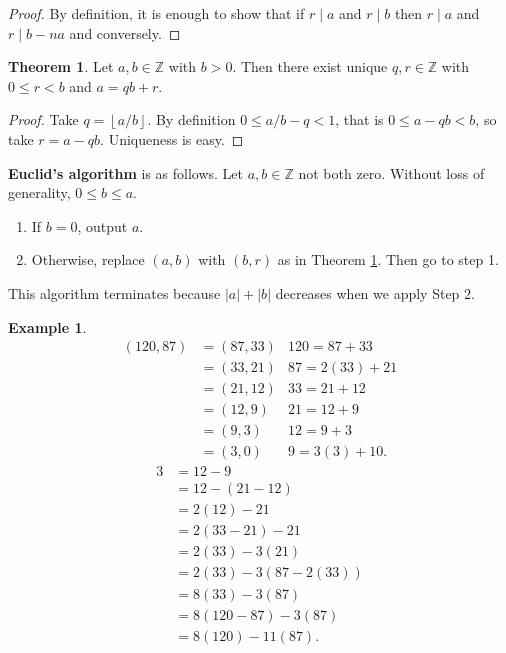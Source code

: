 \documentclass{article}
\newcommand{\Z}{\mathbb{Z}}
\newcommand{\rb}[1]{\left( #1 \right)}
\newcommand{\abs}[1]{\left\lvert #1 \right\rvert}
\newcommand{\fb}[1]{\left\lfloor #1 \right\rfloor}
\theoremstyle{definition}\newtheorem{definition}{Definition}
\theoremstyle{definition}\newtheorem{remark}[definition]{Remark}
\theoremstyle{definition}\newtheorem*{example}{Example}
\theoremstyle{definition}\newtheorem*{note}{Note}
\newtheorem{theorem}[definition]{Theorem}
\begin{document}
\begin{proof}
By definition, it is enough to show that if $ r \mid a $ and $ r \mid b $ then $ r \mid a $ and $ r \mid b - na $ and conversely.
\end{proof}

\begin{theorem}
\label{thm:5}
Let $ a, b \in \Z $ with $ b > 0 $. Then there exist unique $ q, r \in \Z $ with $ 0 \le r < b $ and $ a = qb + r $.
\end{theorem}

\begin{proof}
Take $ q = \fb{a / b} $. By definition $ 0 \le a / b - q < 1 $, that is $ 0 \le a - qb < b $, so take $ r = a - qb $. Uniqueness is easy.
\end{proof}

\textbf{Euclid's algorithm} is as follows. Let $ a, b \in \Z $ not both zero. Without loss of generality, $ 0 \le b \le a $.
\begin{enumerate}[leftmargin=0.5in, label=Step \arabic*.]
\item If $ b = 0 $, output $ a $.
\item Otherwise, replace $ \rb{a, b} $ with $ \rb{b, r} $ as in Theorem \ref{thm:5}. Then go to step 1.
\end{enumerate}
This algorithm terminates because $ \abs{a} + \abs{b} $ decreases when we apply Step $ 2 $.

\begin{example}
\begin{align*}
\rb{120, 87}
& = \rb{87, 33} & 120 = 87 + 33 \\
& = \rb{33, 21} & 87 = 2\rb{33} + 21 \\
& = \rb{21, 12} & 33 = 21 + 12 \\
& = \rb{12, 9} & 21 = 12 + 9 \\
& = \rb{9, 3} & 12 = 9 + 3 \\
& = \rb{3, 0} & 9 = 3\rb{3} + 10.
\end{align*}
\begin{align*}
3
& = 12 - 9 \\
& = 12 - \rb{21 - 12} \\
& = 2\rb{12} - 21 \\
& = 2\rb{33 - 21} - 21 \\
& = 2\rb{33} - 3\rb{21} \\
& = 2\rb{33} - 3\rb{87 - 2\rb{33}} \\
& = 8\rb{33} - 3\rb{87} \\
& = 8\rb{120 - 87} - 3\rb{87} \\
& = 8\rb{120} - 11\rb{87}.
\end{align*}
\end{example}
\end{document}
